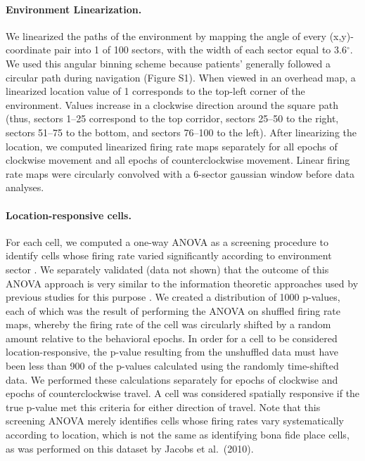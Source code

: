 \paragraph{Environment Linearization.} We linearized the paths of the environment by mapping the angle of every (x,y)-coordinate pair into 1 of 100 sectors, with the width of each sector equal to 3.6$^{\circ}$. We used this angular binning scheme because patients' generally followed a circular path during navigation (Figure S1). When viewed in an overhead map, a linearized location value of 1 corresponds to the top-left corner of the environment. Values increase in a clockwise direction around the square path (thus, sectors 1--25 correspond to the top corridor, sectors 25--50 to the right, sectors 51--75 to the bottom, and sectors 76--100 to the left). After linearizing the location, we computed linearized firing rate maps separately for all epochs of clockwise movement and all epochs of counterclockwise movement. Linear firing rate maps were circularly convolved with a 6-sector gaussian window before data analyses.

\paragraph{Location-responsive cells.}
For each cell, we computed a one-way ANOVA as a screening procedure to identify cells whose firing rate varied significantly according to environment sector \cite{EkstEtal03}.  We separately validated (data not shown) that the outcome of this ANOVA  approach is very similar to the information theoretic approaches used by previous studies for this purpose  \cite{MarkEtal94}.  We created a distribution of 1000 p-values, each of which was the result of performing the ANOVA on shuffled firing rate maps, whereby the firing rate of the cell was circularly shifted by a random amount relative to the behavioral epochs. In order for a cell to be considered location-responsive, the p-value resulting from the unshuffled data must have been less than 900 of the p-values calculated using the randomly time-shifted data. We performed these calculations separately for epochs of clockwise and epochs of counterclockwise travel. A cell was considered spatially responsive if the true p-value met this criteria for either direction of travel.  Note that this screening ANOVA merely identifies cells whose firing rates vary systematically according to  location, which  is not the same as identifying bona fide place cells, as was performed on this dataset by Jacobs et al.\ (2010).

